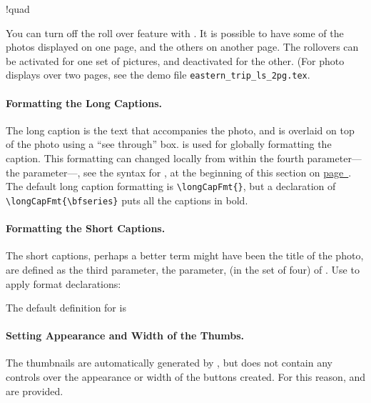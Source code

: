 \documentclass{article}
\begin{document}
\bVerb\takeMeasure{\string\useRollovers\quad\string\noRollovers}%
\begin{dCmd*}[commandchars=!()]{\bxSize}
\useRollovers!quad\noRollovers
\end{dCmd*}
\eVerb
You can turn off the roll over feature with . It is
possible to have some of the photos displayed on one page, and the
others on another page. The rollovers can be activated for one set
of pictures, and deactivated for the other. (For photo displays over
two pages, see the demo file \texttt{eastern\_trip\_ls\_2pg.tex}.


\paragraph*{Formatting the Long Captions.} The long caption is the text that accompanies the
photo, and is overlaid on top of the photo using a ``see through'' box.
 is used for globally formatting the caption. This formatting
can changed locally from within the fourth parameter---the 
parameter---, see the syntax for , at the beginning of this
section on \hyperref[photoAlbum]{page~\pageref*{photoAlbum}}. The default
long caption formatting is \verb!\longCapFmt{}!, but a declaration of
\verb!\longCapFmt{\bfseries}! puts all the captions in bold.
\bVerb{}%
\begin{dCmd*}[commandchars=!()]{\bxSize}
\end{dCmd*}
\endgroup
\paragraph*{Formatting the Short Captions.} The short captions,
perhaps a better term might have been the title of the photo, are
defined as the third parameter, the  parameter, (in
the set of four) of . Use  to apply
format declarations:
\bVerb{}%
\begin{dCmd*}[commandchars=!()]{\bxSize}
\end{dCmd*}
\eVerb The default definition for  is
\begin{dCmd}{.67\linewidth}
\shortCapFmt{\sffamily\bfseries\color{blue}}
\end{dCmd}

\paragraph*{Setting Appearance and Width of the Thumbs.} The thumbnails are
automatically generated by , but  does not
contain any controls over the appearance or width of the buttons created.
For this reason,  and 
are provided.
\end{document}
